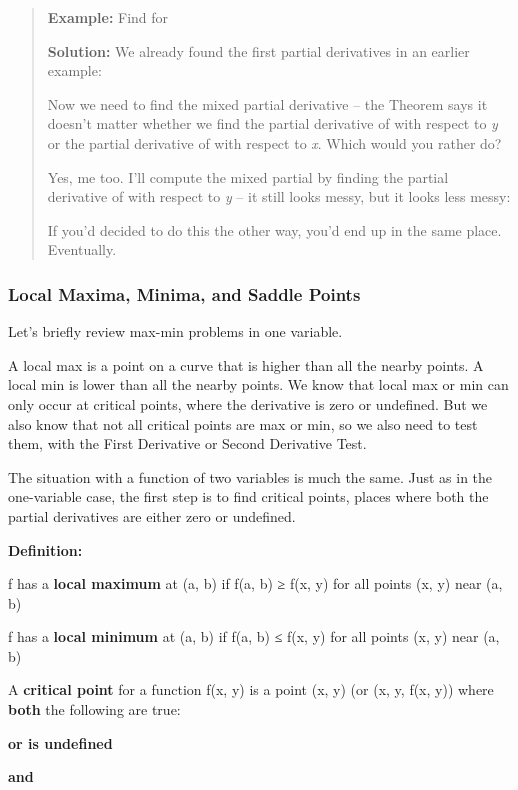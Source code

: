 \begin{quote}
\textbf{Example:} Find for

\textbf{Solution:} We already found the first partial derivatives in an
earlier example:

Now we need to find the mixed partial derivative -- the Theorem says it
doesn't matter whether we find the partial derivative of with respect to
\emph{y} or the partial derivative of with respect to \emph{x}. Which
would you rather do?

Yes, me too. I'll compute the mixed partial by finding the partial
derivative of with respect to \emph{y} -- it still looks messy, but it
looks less messy:

If you'd decided to do this the other way, you'd end up in the same
place. Eventually.
\end{quote}

\subsubsection{Local Maxima, Minima, and Saddle
Points}\label{local-maxima-minima-and-saddle-points}

Let's briefly review max-min problems in one variable.

A local max is a point on a curve that is higher than all the nearby
points. A local min is lower than all the nearby points. We know that
local max or min can only occur at critical points, where the derivative
is zero or undefined. But we also know that not all critical points are
max or min, so we also need to test them, with the First Derivative or
Second Derivative Test.

The situation with a function of two variables is much the same. Just as
in the one-variable case, the first step is to find critical points,
places where both the partial derivatives are either zero or undefined.

\textbf{Definition: }

f has a \textbf{local maximum} at (a, b) if f(a, b) ≥ f(x, y) for all
points (x, y) near (a, b)

f has a \textbf{local minimum} at (a, b) if f(a, b) ≤ f(x, y) for all
points (x, y) near (a, b)

A \textbf{critical point} for a function f(x, y) is a point (x, y) (or
(x, y, f(x, y)) where \textbf{both} the following are true:

\textbf{or is undefined }

\textbf{and}


